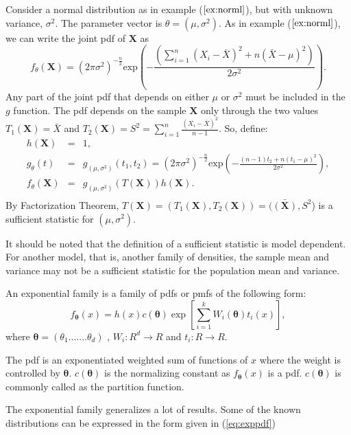 \documentclass[a4paper,english,12pt]{article}
\newcommand{\bX}{\mathbf{X}}
\newcommand{\btheta}{\boldsymbol{\theta}}
\begin{document}
\begin{exmp}
Consider a normal distribution as in example ($\ref{ex:norml}$), but with unknown variance, $\sigma^2$. The parameter vector is $\theta=(\mu,\sigma^2)$. As in example ($\ref{ex:norml}$), we can write the joint pdf of $\bX$ as
\begin{equation}
f_\theta(\bX) = (2\pi\sigma^2)^{-\frac{n}{2}}\text{exp}\left(-\frac{\left(\sum_{i=1}^{n}{(X_i-\bar{X})^2}+n(\bar{X}-\mu)^2\right)}{2\sigma^2}\right). 
\end{equation}
Any part of the joint pdf that depends on either $\mu$ or $\sigma^2$ must be included in the $g$ function. The pdf depends on the sample $\bX$ only through the two values $T_1(\bX) = \bar{X}$ and $T_2(\bX) = S^2= \sum_{i=1}^{n}{\frac{(X_i-\bar{X})^2}{n-1}}$.
So, define:
\begin{eqnarray}
h(\bX)&=& 1,	\nonumber \\
g_\theta(t) &=& g_{(\mu,\sigma^2)}(t_1,t_2)=(2\pi\sigma^2)^{-\frac{n}{2}}\text{exp}\left(-\frac{(n-1)t_2+n(t_1-\mu)^2}{2\sigma^2}\right),\nonumber \\
f_\theta(\bX) &=& g_{(\mu,\sigma^2)}(T(\bX))h(\bX). \nonumber \\
\end{eqnarray}
By Factorization Theorem, $T(\bX)=(T_1(\bX),T_2(\bX)) = (\bar{(\bX)},S^2$) is a sufficient statistic for $(\mu,\sigma^2)$.
\par It should be noted that the definition of a sufficient statistic is model dependent. For another model, that is, another family of densities, the sample mean and variance may not be a sufficient statistic for the population mean and variance.
\end{exmp}
\begin{defn}
An exponential family is a family of pdfs or pmfs of the following form:
\begin{equation} \label{eq:exppdf}
f_{\btheta}(x) = h(x)c(\btheta)\exp\left[\sum_{i=1}^{k} W_i(\btheta)t_i(x)\right],
\end{equation}
where $\btheta = (\theta_1 ....... \theta_d)$ , $W_i:R^d\rightarrow R$ and $t_i:R\rightarrow R$.
\end{defn}
The pdf is an exponentiated weighted sum of functions of $x$ where the weight is controlled by $\btheta$. $c(\btheta)$ is the normalizing constant as $f_{\btheta}(x)$ is a pdf. $c(\btheta)$ is commonly called as the partition function.
\par The exponential family generalizes a lot of results. Some of the known distributions can be expressed in the form given in (\ref{eq:exppdf}) 
\end{document}
